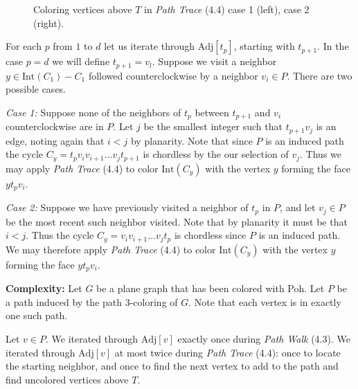 \documentclass[letterpaper, 12pt]{article}
\theoremstyle{thm}
\begin{document}
\begin{figure}
\begin{center}
\caption{Coloring vertices above $T$ in \textit{Path Trace} (4.4) case 1 (left),
case 2 (right).}
\end{center}
\end{figure}

For each $p$ from $1$ to $d$ let us iterate through
$\text{Adj}[t_p]$, starting with $t_{p+1}$. In the case $p=d$ we will define
$t_{p+1}=v_l$. Suppose we visit a neighbor $y\in \text{Int}(C_1)-C_1$ followed
counterclockwise by a neighbor $v_i\in P$. There are two possible cases.

\textit{Case 1:} Suppose none of the neighbors of $t_p$ between $t_{p+1}$ and
$v_i$ counterclockwise are in $P$. Let
$j$ be the smallest integer such that $t_{p+1}v_j$ is an edge, noting again
that $i<j$ by planarity. Note that since $P$ is an induced path the cycle
$C_y=t_pv_iv_{i+1}\ldots v_jt_{p+1}$ is chordless by the our selection of $v_j$.
Thus we may apply \textit{Path Trace} (4.4) to color $\text{Int}(C_y)$ with the
vertex $y$ forming the face $yt_pv_i$.

\textit{Case 2:} Suppose we have previously visited a neighbor of $t_p$ in $P$,
and let $v_j\in P$ be the most recent such neighbor visited. Note that by planarity
it must be that $i<j$. Thus the cycle $C_y=v_iv_{i+1}\ldots v_jt_p$ is chordless
since $P$ is an induced path.
We may therefore apply \textit{Path Trace} (4.4) to color $\text{Int}(C_y)$ with
the vertex $y$ forming the face $yt_pv_i$.

\noindent\textbf{Complexity:} Let $G$ be a plane graph that has been colored
with Poh. Let $P$ be a path induced by the path $3$-coloring of $G$. Note that each
vertex is in exactly one such path.

Let $v\in P$. We iterated through $\text{Adj}[v]$ exactly once during
\textit{Path Walk} (4.3). We iterated through $\text{Adj}[v]$ at most twice
during \textit{Path Trace} (4.4): once to locate
the starting neighbor, and once to find the next vertex to add to the path and
find uncolored vertices above $T$.
\end{document}
